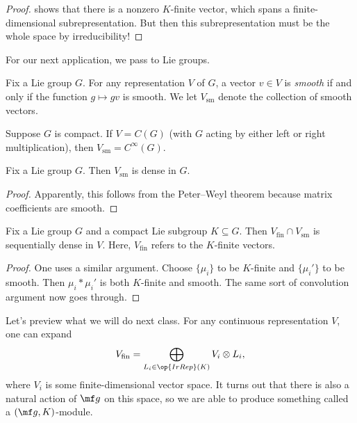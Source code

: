 \documentclass[../notes.tex]{subfiles}
\begin{document}
\begin{proof}
	 shows that there is a nonzero $K$-finite vector, which spans a finite-dimensional subrepresentation. But then this subrepresentation must be the whole space by irreducibility!
\end{proof}
For our next application, we pass to Lie groups.
\begin{definition}[smooth]
	Fix a Lie group $G$. For any representation $V$ of $G$, a vector $v\in V$ is \textit{smooth} if and only if the function $g\mapsto gv$ is smooth. We let $V_{\mathrm{sm}}$ denote the collection of smooth vectors.
\end{definition}
\begin{remark}
	Suppose $G$ is compact. If $V=C(G)$ (with $G$ acting by either left or right multiplication), then $V_{\mathrm{sm}}=C^\infty(G)$.
\end{remark}
\begin{proposition}
	Fix a Lie group $G$. Then $V_{\mathrm{sm}}$ is dense in $G$.
\end{proposition}
\begin{proof}
	Apparently, this follows from the Peter--Weyl theorem because matrix coefficients are smooth.
\end{proof}
\begin{proposition}
	Fix a Lie group $G$ and a compact Lie subgroup $K\subseteq G$. Then $V_{\mathrm{fin}}\cap V_{\mathrm{sm}}$ is sequentially dense in $V$. Here, $V_{\mathrm{fin}}$ refers to the $K$-finite vectors.
\end{proposition}
\begin{proof}
	One uses a similar argument. Choose $\{\mu_i\}$ to be $K$-finite and $\{\mu_i'\}$ to be smooth. Then $\mu_i*\mu_i'$ is both $K$-finite and smooth. The same sort of convolution argument now goes through.
\end{proof}
Let's preview what we will do next class. For any continuous representation $V$, one can expand
\[V_{\mathrm{fin}}=\bigoplus_{L_i\in\op{IrRep}(K)}V_i\otimes L_i,\]
where $V_i$ is some finite-dimensional vector space. It turns out that there is also a natural action of $\mf g$ on this space, so we are able to produce something called a $(\mf g,K)$-module.
\end{document}
